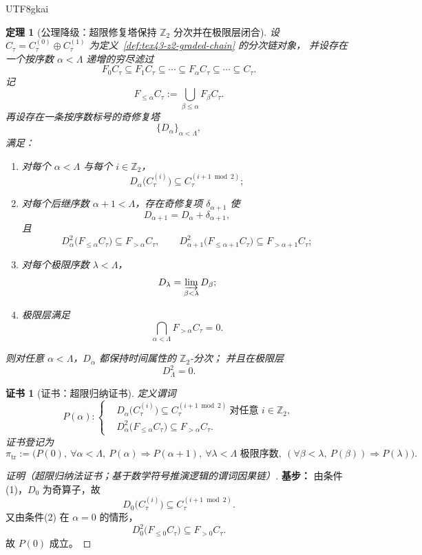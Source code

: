 \documentclass[12pt]{article}
\newtheorem{theorem}{定理}[section]
\newtheorem{Certificate}{证书}[section]
\newcommand{\Ztwo}{\mathbb{Z}_2}
\begin{document}
\begin{CJK*}{UTF8}{gkai}
\begin{theorem}[公理降级：超限修复塔保持 \texorpdfstring{$\Ztwo$}{Z2} 分次并在极限层闭合]
\label{thm:tex43-time-transfinite}
设 $C_{\tau}=C_{\tau}^{(0)}\oplus C_{\tau}^{(1)}$ 为定义~\ref{def:tex43-z2-graded-chain} 的分次链对象，
并设存在一个按序数 $\alpha<\Lambda$ 递增的穷尽滤过
\[
  F_0C_{\tau}\subseteq F_1C_{\tau}\subseteq\cdots\subseteq F_\alpha C_{\tau}\subseteq\cdots\subseteq C_{\tau}.
\]
记
\[
  F_{\le \alpha}C_{\tau}:=\bigcup_{\beta\le \alpha}F_\beta C_{\tau}.
\]
再设存在一条按序数标号的奇修复塔
\[
  \{D_\alpha\}_{\alpha<\Lambda},
\]
满足：
\begin{enumerate}
  \item 对每个 $\alpha<\Lambda$ 与每个 $i\in\Ztwo$，
  \[
    D_\alpha\bigl(C_{\tau}^{(i)}\bigr)\subseteq C_{\tau}^{(i+1\bmod 2)};
  \]
  \item 对每个后继序数 $\alpha+1<\Lambda$，存在奇修复项 $\delta_{\alpha+1}$ 使
  \[
    D_{\alpha+1}=D_\alpha+\delta_{\alpha+1},
  \]
  且
  \[
    D_\alpha^2\bigl(F_{\le \alpha}C_{\tau}\bigr)\subseteq F_{>\alpha}C_{\tau},
    \qquad
    D_{\alpha+1}^2\bigl(F_{\le \alpha+1}C_{\tau}\bigr)\subseteq F_{>\alpha+1}C_{\tau};
  \]
  \item 对每个极限序数 $\lambda<\Lambda$，
  \[
    D_\lambda=\varinjlim_{\beta<\lambda}D_\beta;
  \]
  \item 极限层满足
  \[
    \bigcap_{\alpha<\Lambda}F_{>\alpha}C_{\tau}=0.
  \]
\end{enumerate}
则对任意 $\alpha<\Lambda$，$D_\alpha$ 都保持时间属性的 \(\Ztwo\)-分次；
并且在极限层
\[
  D_\Lambda^2=0.
\]
\end{theorem}

\begin{Certificate}[证书：超限归纳证书]
\label{cert:tex43-time-transfinite}
定义谓词
\[
  P(\alpha):
  \left\{
  \begin{aligned}
    &D_\alpha\bigl(C_{\tau}^{(i)}\bigr)\subseteq C_{\tau}^{(i+1\bmod 2)}
    \ \text{对任意 }i\in\Ztwo,\\
    &D_\alpha^2\bigl(F_{\le \alpha}C_{\tau}\bigr)\subseteq F_{>\alpha}C_{\tau}.
  \end{aligned}
  \right.
\]
证书登记为
\[
  \pi_{\mathrm{tr}}
  :=
  \bigl(P(0),\ \forall\alpha<\Lambda,\ P(\alpha)\Rightarrow P(\alpha+1),\ \forall\lambda<\Lambda\text{ 极限序数},\
    (\forall\beta<\lambda,\ P(\beta))\Rightarrow P(\lambda)\bigr).
\]
\end{Certificate}

\begin{proof}[证明（超限归纳法证书；基于数学符号推演逻辑的谓词因果链）]
\textbf{基步：}
由条件(1)，$D_0$ 为奇算子，故
\[
  D_0\bigl(C_{\tau}^{(i)}\bigr)\subseteq C_{\tau}^{(i+1\bmod 2)}.
\]
又由条件(2) 在 $\alpha=0$ 的情形，
\[
  D_0^2\bigl(F_{\le 0}C_{\tau}\bigr)\subseteq F_{>0}C_{\tau}.
\]
故 $P(0)$ 成立。


\end{proof}
\end{CJK*}
\end{document}
